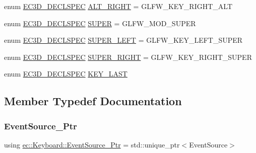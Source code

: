 \begin{DoxyCompactItemize}
\item 
enum \mbox{\hyperlink{_common_8h_aac42573e202ca3dd4d259c81691e2369}{E\+C3\+D\+\_\+\+D\+E\+C\+L\+S\+P\+EC}} \mbox{\hyperlink{classec_1_1_keyboard_a02d38de4e933d4ed6712fc688d428019}{A\+L\+T\+\_\+\+R\+I\+G\+HT}} = G\+L\+F\+W\+\_\+\+K\+E\+Y\+\_\+\+R\+I\+G\+H\+T\+\_\+\+A\+LT
\item 
enum \mbox{\hyperlink{_common_8h_aac42573e202ca3dd4d259c81691e2369}{E\+C3\+D\+\_\+\+D\+E\+C\+L\+S\+P\+EC}} \mbox{\hyperlink{classec_1_1_keyboard_a30098a75ef82c64a8f01147ada71f465}{S\+U\+P\+ER}} = G\+L\+F\+W\+\_\+\+M\+O\+D\+\_\+\+S\+U\+P\+ER
\item 
enum \mbox{\hyperlink{_common_8h_aac42573e202ca3dd4d259c81691e2369}{E\+C3\+D\+\_\+\+D\+E\+C\+L\+S\+P\+EC}} \mbox{\hyperlink{classec_1_1_keyboard_a0d12c25511dcf7ba48a4b926303d7f8b}{S\+U\+P\+E\+R\+\_\+\+L\+E\+FT}} = G\+L\+F\+W\+\_\+\+K\+E\+Y\+\_\+\+L\+E\+F\+T\+\_\+\+S\+U\+P\+ER
\item 
enum \mbox{\hyperlink{_common_8h_aac42573e202ca3dd4d259c81691e2369}{E\+C3\+D\+\_\+\+D\+E\+C\+L\+S\+P\+EC}} \mbox{\hyperlink{classec_1_1_keyboard_a8b2f2d479c90e90ae51fbbbc4c21c980}{S\+U\+P\+E\+R\+\_\+\+R\+I\+G\+HT}} = G\+L\+F\+W\+\_\+\+K\+E\+Y\+\_\+\+R\+I\+G\+H\+T\+\_\+\+S\+U\+P\+ER
\item 
enum \mbox{\hyperlink{_common_8h_aac42573e202ca3dd4d259c81691e2369}{E\+C3\+D\+\_\+\+D\+E\+C\+L\+S\+P\+EC}} \mbox{\hyperlink{classec_1_1_keyboard_a599f8a3b8addd9f6cdabfad9d0e773c4}{K\+E\+Y\+\_\+\+L\+A\+ST}}
\end{DoxyCompactItemize}


\subsection{Member Typedef Documentation}
\mbox{\label{classec_1_1_keyboard_a9d797ac5b4d42f3b586091bcc14e6343}} 
\subsubsection{\texorpdfstring{Event\+Source\+\_\+\+Ptr}{EventSource\_Ptr}}
{\footnotesize\ttfamily using \mbox{\hyperlink{classec_1_1_keyboard_a9d797ac5b4d42f3b586091bcc14e6343}{ec\+::\+Keyboard\+::\+Event\+Source\+\_\+\+Ptr}} =  std\+::unique\+\_\+ptr$<$Event\+Source$>$}



